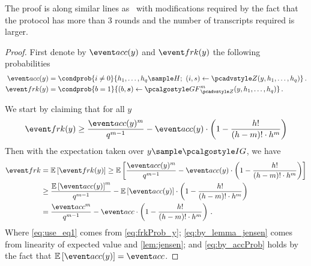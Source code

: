 The proof is along similar lines as~\cite[Lemma 1]{CCS:BelNev06} with modifications required
by the fact that the protocol has more than $3$ rounds and the number of
transcripts required is larger. 

\begin{proof}
First denote by $\accProb(y)$ and $\frkProb(y)$ the following probabilities
\begin{align*}
\accProb(y) & =  \condprob{i \neq 0}{h_1, \ldots, h_q \sample H;\ (i, s)
\gets \zdv(y, h_1, \ldots, h_q)}\,.\\
	\frkProb(y) & = \condprob{b = 1}{(b, \vec{s}) \gets
\genforking_{\zdv}^{m}(y, h_1, \ldots, h_q)}\,.
\end{align*}

We start by claiming that for all $y$ 
\begin{equation}\label{eq:frkProb_y}
	\frkProb(y) \geq 
	\frac{\accProb(y)^m}{q^{m - 1}} - \accProb(y) \cdot \left(1 -
  \frac{h!}{(h - m)! \cdot h^{m}}\right)
	\end{equation}
Then with the expectation taken over $y \sample \ig$, we have
\begin{align}
	\frkProb & = \expected{\frkProb(y)} \geq
	\expected{\frac{\accProb(y)^m}{q^{m - 1}} -  \accProb(y) \cdot \left(1 -
  \frac{h!}{(h - m)! \cdot h^{m}}\right)} \label{eq:use_eq1}\\
	& \geq \frac{\expected{\accProb(y)}^m}{q^{m - 1}} -
	\expected{\accProb(y)} \cdot \left(1 - \frac{h!}{(h - m)! \cdot
  h^{m}}\right) \label{eq:by_lemma_jensen}\\
	& = \frac{\accProb^m}{q^{m - 1}} -  \accProb \cdot \left(1 -
  \frac{h!}{(h - m)! \cdot h^{m}}\right)\label{eq:by_accProb}\,.
\end{align}
Where \cref{eq:use_eq1} comes from \cref{eq:frkProb_y};
\cref{eq:by_lemma_jensen} comes from linearity of expected value and \cref{lem:jensen}; and
\cref{eq:by_accProb} holds by the fact that $\expected{\accProb(y)} =
\accProb$.


\end{proof}
